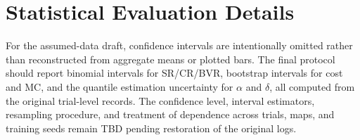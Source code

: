 \documentclass{article}
\begin{document}
\section{Statistical Evaluation Details}
\label{app:statistical_evaluation}
For the assumed-data draft, confidence intervals are intentionally omitted rather
than reconstructed from aggregate means or plotted bars. The final protocol should
report binomial intervals for SR/CR/BVR, bootstrap intervals for cost and MC, and
the quantile estimation uncertainty for $\alpha$ and $\delta$, all computed from
the original trial-level records. The confidence level, interval estimators,
resampling procedure, and treatment of dependence across trials, maps, and
training seeds remain \textsc{TBD} pending restoration of the original logs.


\end{document}
